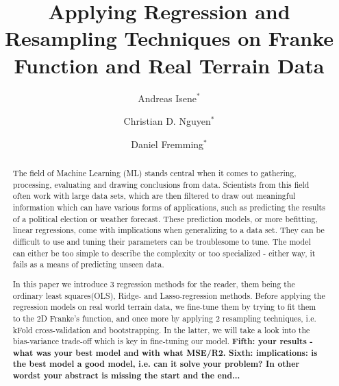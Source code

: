 \documentclass[aps,rmp,reprint,amsmath,amssymb,graphicx,longbibliography]{revtex4-1}
\begin{document}

\title{ Applying Regression and Resampling Techniques on Franke Function and Real Terrain Data }

\author{Andreas Isene$^*$}
\author{Christian D. Nguyen$^*$}
\author{Daniel Fremming$^*$}





\begin{comment}
The abstract gives the reader a quick overview of what has been done and the most important results. Try to be to the point and state your main findings. It could be structured as follows

    Short introduction to topic and why its important
    Introduce a challenge or unresolved issue with the topic (that you will try to solve)
    What have you done to solve this
    Main Results
    The implications
\end{comment}

\begin{abstract}


     
     The field of Machine Learning (ML) stands central when it comes to gathering, processing, evaluating and drawing conclusions from data. 
     Scientists from this field often work with large data sets, which are then filtered to draw out meaningful information which can have various forms of applications, such as predicting the results of a political election or weather forecast. These prediction models, or more befitting, linear regressions, come with implications when generalizing to a data set. They can be difficult to use and tuning their parameters can be troublesome to tune. The model can either be too simple to describe the complexity or too specialized - either way, it fails as a means of predicting unseen data.
     
     In this paper we introduce 3 regression methods for the reader, them being the ordinary least squares(OLS), Ridge- and Lasso-regression methods. Before applying the regression models on real world terrain data, we fine-tune them by trying to fit them to the 2D Franke's function, and once more by applying 2 resampling techniques, i.e. kFold cross-validation and bootstrapping. In the latter, we will take a look into the bias-variance trade-off which is key in fine-tuning our model.
     \textbf{Fifth: your results - what was your best model and with what MSE/R2. Sixth: implications: is the best model a good model, i.e. can it solve your problem? In other wordst your abstract is missing the start and the end... }
     
\end{abstract}
\end{document}
